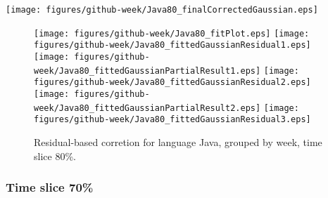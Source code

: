 \begin{center}
{\texttt{[image: figures/github-week/Java80\_finalCorrectedGaussian.eps]}}
\end{center}

\FloatBarrier

\begin{figure}[t]
\centering
{}
{\texttt{[image: figures/github-week/Java80\_fitPlot.eps]}}
{\texttt{[image: figures/github-week/Java80\_fittedGaussianResidual1.eps]}}
{\texttt{[image: figures/github-week/Java80\_fittedGaussianPartialResult1.eps]}}
{\texttt{[image: figures/github-week/Java80\_fittedGaussianResidual2.eps]}}
{\texttt{[image: figures/github-week/Java80\_fittedGaussianPartialResult2.eps]}}
{\texttt{[image: figures/github-week/Java80\_fittedGaussianResidual3.eps]}}
\caption{Residual-based corretion for language Java, grouped by week, time slice 80\%.}
\end{figure}


\FloatBarrier


\subsubsection{Time slice 70\%}

